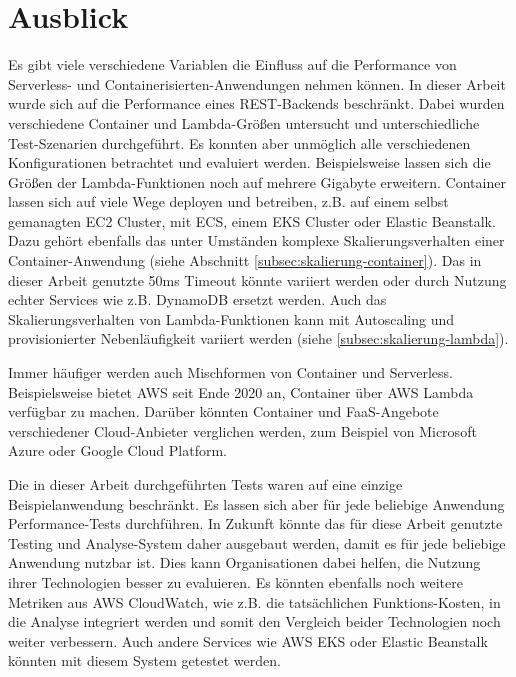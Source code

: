 \section{Ausblick}
Es gibt viele verschiedene Variablen die Einfluss auf die Performance von Serverless- und Containerisierten-Anwendungen nehmen können. In dieser Arbeit wurde sich auf die Performance eines REST-Backends beschränkt. Dabei wurden verschiedene Container und Lambda-Größen untersucht und unterschiedliche Test-Szenarien durchgeführt. Es konnten aber unmöglich alle verschiedenen Konfigurationen betrachtet und evaluiert werden. Beispielsweise lassen sich die Größen der Lambda-Funktionen noch auf mehrere Gigabyte erweitern. Container lassen sich auf viele Wege deployen und betreiben, z.B. auf einem selbst gemanagten EC2 Cluster, mit ECS, einem EKS Cluster oder Elastic Beanstalk. Dazu gehört ebenfalls das unter Umständen komplexe Skalierungsverhalten einer Container-Anwendung (siehe Abschnitt \ref{subsec:skalierung-container}). Das in dieser Arbeit genutzte 50ms Timeout könnte variiert werden oder durch Nutzung echter Services wie z.B. DynamoDB ersetzt werden. Auch das Skalierungsverhalten von Lambda-Funktionen kann mit Autoscaling und provisionierter Nebenläufigkeit variiert werden (siehe \ref{subsec:skalierung-lambda}). 

Immer häufiger werden auch Mischformen von Container und Serverless. Beispielsweise bietet AWS seit Ende 2020 an, Container über AWS Lambda verfügbar zu machen\cite{noauthor_aws_nodate-1}. Darüber könnten Container und FaaS-Angebote verschiedener Cloud-Anbieter verglichen werden, zum Beispiel von Microsoft Azure oder Google Cloud Platform.

Die in dieser Arbeit durchgeführten Tests waren auf eine einzige Beispielanwendung beschränkt. Es lassen sich aber für jede beliebige Anwendung Performance-Tests durchführen. In Zukunft könnte das für diese Arbeit genutzte Testing und Analyse-System daher ausgebaut werden, damit es für jede beliebige Anwendung nutzbar ist. Dies kann Organisationen dabei helfen, die Nutzung ihrer Technologien besser zu evaluieren. Es könnten ebenfalls noch weitere Metriken aus AWS CloudWatch, wie z.B. die tatsächlichen Funktions-Kosten, in die Analyse integriert werden und somit den Vergleich beider Technologien noch weiter verbessern. Auch andere Services wie AWS EKS oder Elastic Beanstalk könnten mit diesem System getestet werden.

